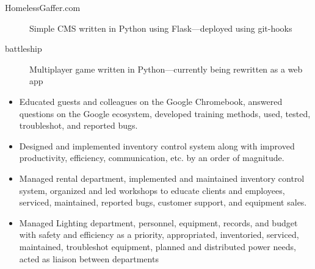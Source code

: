 \documentclass[letterpaper]{article}        %
\begin{document}

  \begin{description}
    \item[HomelessGaffer.com] Simple CMS written in Python using Flask---deployed using git-hooks
    \item[battleship] Multiplayer game written in Python---currently being rewritten as a web app
    
  \end{description}




  
    \begin{itemize}
    \item Educated guests and colleagues on the Google Chromebook, answered questions on the Google ecosystem, developed training methods, used, tested, troubleshot, and reported bugs.
    \end{itemize}
  
    \begin{itemize}
    \item Designed and implemented inventory control system along with improved productivity, efficiency, communication, etc. by an order of magnitude.
    \end{itemize}
  
    \begin{itemize}
    \item Managed rental department, implemented and maintained inventory control system, organized and led workshops to educate clients and employees, serviced, maintained, reported bugs, customer support, and equipment sales.
    \end{itemize}
  
    \begin{itemize}
    \item Managed Lighting department, personnel, equipment, records, and budget with safety and efficiency as a priority, appropriated, inventoried, serviced, maintained, troubleshot equipment, planned and distributed power needs, acted as liaison between departments
    \end{itemize}
  
\end{document}
